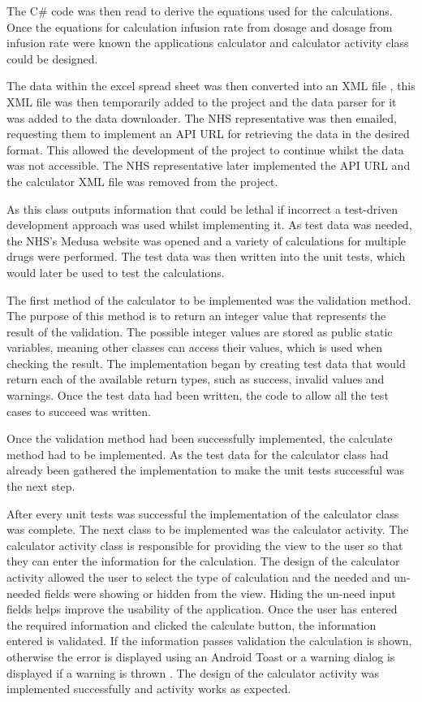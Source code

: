 The C\# code was then read to derive the equations used for the calculations. Once the equations for calculation infusion rate from dosage and dosage from infusion rate were known the applications calculator and calculator activity class could be designed.

The data within the excel spread sheet was then converted into an XML file \cite{xml}, this XML file was then temporarily added to the project and the data parser for it was added to the data downloader. The NHS representative was then emailed, requesting them to implement an API URL for retrieving the data in the desired format. This allowed the development of the project to continue whilst the data was not accessible. The NHS representative later implemented the API URL and the calculator XML file was removed from the project.

As this class outputs information that could be lethal if incorrect a test-driven development \cite{tdd} approach was used whilst implementing it. As test data was needed, the NHS's Medusa website \cite{medusa} was opened and a variety of calculations for multiple drugs were performed. The test data was then written into the unit tests, which would later be used to test the calculations.

The first method of the calculator to be implemented was the validation method. The purpose of this method is to return an integer value that represents the result of the validation. The possible integer values are stored as public static variables, meaning other classes can access their values, which is used when checking the result. The implementation began by creating test data that would return each of the available return types, such as success, invalid values and warnings. Once the test data had been written, the code to allow all the test cases to succeed was written. 

Once the validation method had been successfully implemented, the calculate method had to be implemented. As the test data for the calculator class had already been gathered the implementation to make the unit tests successful was the next step.

After every unit tests was successful the implementation of the calculator class was complete. The next class to be implemented was the calculator activity. The calculator activity class is responsible for providing the view to the user so that they can enter the information for the calculation. The design of the calculator activity allowed the user to select the type of calculation and the needed and un-needed fields were showing or hidden from the view. Hiding the un-need input fields helps improve the usability of the application. Once the user has entered the required information and clicked the calculate button, the information entered is validated. If the information passes validation the calculation is shown, otherwise the error is displayed using an Android Toast or a warning dialog is displayed if a warning is thrown \cite{dialog}. The design of the calculator activity was implemented successfully and activity works as expected.

